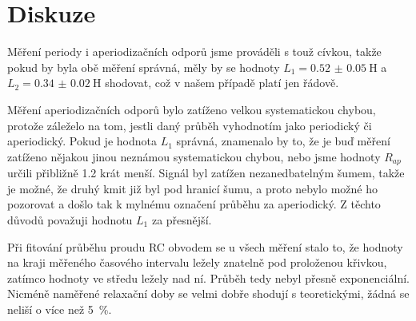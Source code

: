 \section*{Diskuze}
Měření periody i aperiodizačních odporů jsme prováděli s touž cívkou, takže pokud by byla obě měření správná, měly by se hodnoty $L_1=\SI{0.52(5)}{\henry}$ a $L_2=\SI{0.34(2)}{\henry}$ shodovat, což v našem případě platí jen řádově.


Měření aperiodizačních odporů bylo zatíženo velkou systematickou chybou, protože záleželo na tom, jestli daný průběh vyhodnotím jako periodický či aperiodický.
Pokud je hodnota $L_1$ správná, znamenalo by to, že je buď měření zatíženo nějakou jinou neznámou systematickou chybou, nebo jsme hodnoty $R_{ap}$ určili přibližně \num{1.2} krát menší.
Signál byl zatížen nezanedbatelným šumem, takže je možné, že druhý kmit již byl pod hranicí šumu, a proto nebylo možné ho pozorovat a došlo tak k mylnému označení průběhu za aperiodický.
Z těchto důvodů považuji hodnotu $L_1$ za přesnější.

Při fitování průběhu proudu RC obvodem se u všech měření stalo to, že hodnoty na kraji měřeného časového intervalu ležely znatelně pod proloženou křivkou, zatímco hodnoty ve středu ležely nad ní.
Průběh tedy nebyl přesně exponenciální.
Nicméně naměřené relaxační doby se velmi dobře shodují s teoretickými, žádná se neliší o více než \SI{5}{\percent}.